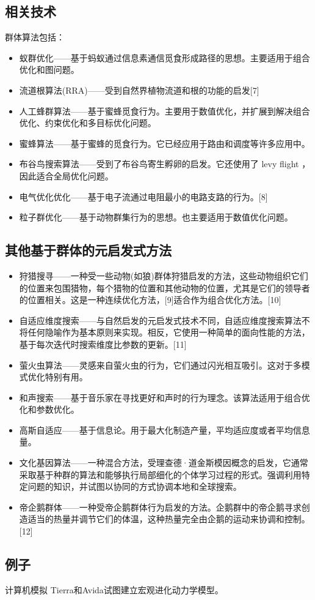 \subsection{相关技术}
群体算法包括：
\begin{itemize}
\item 蚁群优化——基于蚂蚁通过信息素通信觅食形成路径的思想。主要适用于组合优化和图问题。
\item 流道根算法(RRA)——受到自然界植物流道和根的功能的启发[7]
\item 人工蜂群算法——基于蜜蜂觅食行为。主要用于数值优化，并扩展到解决组合优化、约束优化和多目标优化问题。
\item 蜜蜂算法——基于蜜蜂的觅食行为。它已经应用于路由和调度等许多应用中。
\item 布谷鸟搜索算法——受到了布谷鸟寄生孵卵的启发。它还使用了 levy flight ，因此适合全局优化问题。
\item 电气优化优化——基于电子流通过电阻最小的电路支路的行为。[8]
\item 粒子群优化——基于动物群集行为的思想。也主要适用于数值优化问题。
\end{itemize}

\subsection{其他基于群体的元启发式方法}
\begin{itemize}
\item 狩猎搜寻——一种受一些动物(如狼)群体狩猎启发的方法，这些动物组织它们的位置来包围猎物，每个猎物的位置和其他动物的位置，尤其是它们的领导者的位置相关。这是一种连续优化方法，[9]适合作为组合优化方法。[10]
\item 自适应维度搜索——与自然启发的元启发式技术不同，自适应维度搜索算法不将任何隐喻作为基本原则来实现。相反，它使用一种简单的面向性能的方法，基于每次迭代时搜索维度比参数的更新。[11]
\item 萤火虫算法——灵感来自萤火虫的行为，它们通过闪光相互吸引。这对于多模式优化特别有用。
\item 和声搜索——基于音乐家在寻找更好和声时的行为理念。该算法适用于组合优化和参数优化。
\item 高斯自适应——基于信息论。用于最大化制造产量，平均适应度或者平均信息量。
\item 文化基因算法——一种混合方法，受理查德·道金斯模因概念的启发，它通常采取基于种群的算法和能够执行局部细化的个体学习过程的形式。强调利用特定问题的知识，并试图以协同的方式协调本地和全球搜索。
\item 帝企鹅群体——一种受帝企鹅群体行为启发的方法。企鹅群中的帝企鹅寻求创造适当的热量并调节它们的体温，这种热量完全由企鹅的运动来协调和控制。[12]
\end{itemize}

\subsection{例子}
计算机模拟 Tierra和Avida试图建立宏观进化动力学模型。
